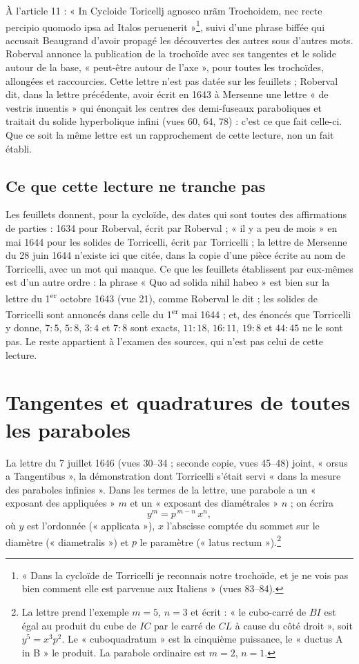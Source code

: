 \documentclass[11pt,a4paper]{article}
\begin{document}
À l'article 11 : « In Cycloide Toricellj agnosco nrãm Trochoidem, nec recte
percipio quomodo ipsa ad Italos peruenerit »\footnote{« Dans la cycloïde de
Torricelli je reconnais notre trochoïde, et je ne vois pas bien comment elle est
parvenue aux Italiens » (vues 83--84).}, suivi d'une phrase biffée qui accusait
Beaugrand d'avoir propagé les découvertes des autres sous d'autres mots. Roberval
annonce la publication de la trochoïde avec ses tangentes et le solide autour de
la base, « peut-être autour de l'axe », pour toutes les trochoïdes, allongées et
raccourcies. Cette lettre n'est pas datée sur les feuillets ; Roberval dit, dans
la lettre précédente, avoir écrit en 1643 à Mersenne une lettre « de vestris
inuentis » qui énonçait les centres des demi-fuseaux paraboliques et traitait du
solide hyperbolique infini (vues 60, 64, 78) : c'est ce que fait celle-ci. Que ce
soit la même lettre est un rapprochement de cette lecture, non un fait établi.

\subsection*{Ce que cette lecture ne tranche pas}

Les feuillets donnent, pour la cycloïde, des dates qui sont toutes des
affirmations de parties : 1634 pour Roberval, écrit par Roberval ; « il y a peu de
mois » en mai 1644 pour les solides de Torricelli, écrit par Torricelli ; la
lettre de Mersenne du 28 juin 1644 n'existe ici que citée, dans la copie d'une
pièce écrite au nom de Torricelli, avec un mot qui manque. Ce que les feuillets
établissent par eux-mêmes est d'un autre ordre : la phrase « Quo ad solida nihil habeo » est
bien sur la lettre du 1\textsuperscript{er} octobre 1643 (vue 21), comme Roberval
le dit ; les solides de Torricelli sont annoncés dans celle du
1\textsuperscript{er} mai 1644 ; et, des énoncés que Torricelli y donne, $7:5$,
$5:8$, $3:4$ et $7:8$ sont exacts, $11:18$, $16:11$, $19:8$ et $44:45$ ne le sont
pas. Le reste appartient à l'examen des sources, qui n'est pas celui de cette
lecture.

\section*{Tangentes et quadratures de toutes les paraboles}

La lettre du 7 juillet 1646 (vues 30--34 ; seconde copie, vues 45--48) joint,
« orsus a Tangentibus », la démonstration dont Torricelli s'était servi « dans
la mesure des paraboles infinies ». Dans les termes de la lettre, une parabole a
un « exposant des appliquées » $m$ et un « exposant des diamétrales » $n$ ; on
écrira
\[
y^m = p^{\,m-n}\,x^n ,
\]
où $y$ est l'ordonnée (« applicata »), $x$ l'abscisse comptée du sommet sur le
diamètre (« diametralis ») et $p$ le paramètre (« latus rectum »).\footnote{La
lettre prend l'exemple $m=5$, $n=3$ et écrit : « le cubo-carré de $BI$ est égal
au produit du cube de $IC$ par le carré de $CL$ à cause du côté droit », soit
$y^5 = x^3p^2$. Le « cuboquadratum » est la cinquième puissance, le « ductus A
in B » le produit. La parabole ordinaire est $m=2$, $n=1$.}
\end{document}
